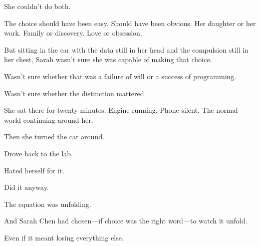She couldn't do both.

The choice should have been easy. Should have been obvious. Her daughter or her work. Family or discovery. Love or obsession.

But sitting in the car with the data still in her head and the compulsion still in her chest, Sarah wasn't sure she was capable of making that choice.

Wasn't sure whether that was a failure of will or a success of programming.

Wasn't sure whether the distinction mattered.

She sat there for twenty minutes. Engine running. Phone silent. The normal world continuing around her.

Then she turned the car around.

Drove back to the lab.

Hated herself for it.

Did it anyway.

The equation was unfolding.

And Sarah Chen had chosen—if choice was the right word—to watch it unfold.

Even if it meant losing everything else.

